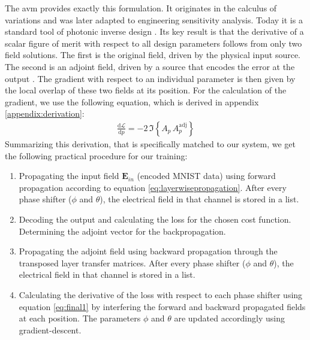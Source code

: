 The \gls{avm} provides exactly this formulation. 
It originates in the calculus of variations and was later adapted to engineering sensitivity analysis. 
Today it is a standard tool of photonic inverse design
\cite{gilesIntroductionAdjointApproach2000, veronisMethodSensitivityAnalysis2004, moleskyInverseDesignNanophotonics2018}.
Its key result is that the derivative of a scalar figure of merit with respect to all design parameters follows from only two field solutions. 
The first is the original field, driven by the physical input source. 
The second is an adjoint field, driven by a source that encodes the error at the output \cite{hughesAdjointMethodInverse2018}. 
The gradient with respect to an individual parameter is then given by the local overlap of these two fields at its position.
For the calculation of the gradient, we use the following equation, which is derived in appendix \ref{appendix:derivation}:
\begin{align}
    \frac{\mathrm{d}\mathcal{L}}{\mathrm{d}p}
    = -2\,\Im\left\{ A_p\,A_p^{\mathrm{adj}} \right\}
    \label{eq:final1}
\end{align}
Summarizing this derivation, that is specifically matched to our system, we get the following practical procedure for our training:
\begin{enumerate}
    \item Propagating the input field $\mathbf{E}_{in}$ (encoded MNIST data) using forward propagation according to equation \eqref{eq:layerwisepropagation}. After every phase shifter ($\phi$ and $\theta$), the electrical field in that channel is stored in a list.
    \item Decoding the output and calculating the loss for the chosen cost function. Determining the adjoint vector for the backpropagation.
    \item Propagating the adjoint field using backward propagation through the transposed layer transfer matrices. After every phase shifter ($\phi$ and $\theta$), the electrical field in that channel is stored in a list.
    \item Calculating the derivative of the loss with respect to each phase shifter using equation \eqref{eq:final1} by interfering the forward and backward propagated fields at each position.
    The parameters $\phi$ and $\theta$ are updated accordingly using gradient-descent.
\end{enumerate}

